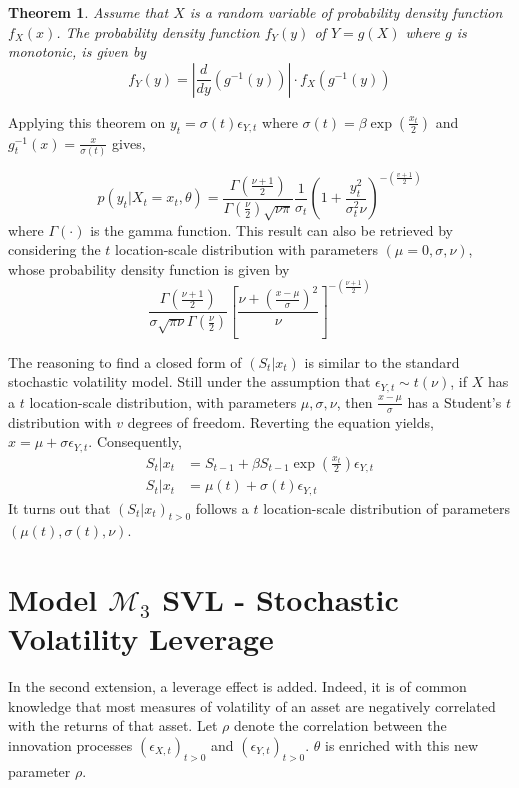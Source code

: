 \documentclass[11pt,a4,twosided,singlespacing,titlepagenumber=on]{scrreprt}
\numberwithin{equation}{chapter} %
\newtheorem{theorem}{Theorem}%
\theoremstyle{remark}
\begin{document}
\begin{theorem}
\textit{
Assume that $X$ is a random variable of probability density function $f_X(x)$. The probability density function $f_Y(y)$ of $Y=g(X)$ where $g$ is monotonic, is given by
}
$$f_Y(y) = \left|\frac{d}{dy}(g^{-1}(y))\right| \cdot f_X(g^{-1}(y))$$
\end{theorem}

\noindent
Applying this theorem on $y_t = \sigma(t) \epsilon_{Y,t}$ where $\sigma(t) = \beta \exp \left(\frac{x_t}{2} \right)$ and $g^{-1}_t(x) = \frac{x}{\sigma(t)}$ gives,

$$p(y_t | X_t = x_t, \theta) = \frac{\Gamma(\frac{\nu+1}{2})}{\Gamma(\frac{\nu}{2}) \sqrt{\nu\pi}} \frac{1}{\sigma_t}\left( 1 + \frac{y_t^2}{\sigma_t^2 \nu}\right)^{-\left(\frac{v+1}{2} \right)}$$
where $\Gamma(\cdot)$ is the gamma function. This result can also be retrieved by considering the $t$ location-scale distribution with parameters $(\mu = 0, \sigma, \nu)$, whose probability density function is given by
$$\frac{\Gamma \left(\frac{\nu+1}{2} \right)}{\sigma \sqrt{\pi \nu} \Gamma \left(\frac{\nu}{2} \right)} \left[ \frac{\nu + \left( \frac{x-\mu}{\sigma}\right)^2}{\nu}\right]^{-\left(\frac{\nu+1}{2} \right)}$$

The reasoning to find a closed form of $(S_t | x_t)$ is similar to the standard stochastic volatility model. Still under the assumption that $\epsilon_{Y,t} \sim t(\nu)$, if $X$ has a $t$ location-scale distribution, with parameters $\mu, \sigma, \nu$, then $\frac{x-\mu}{\sigma}$ has a Student's $t$ distribution with $v$ degrees of freedom. Reverting the equation yields, $x = \mu + \sigma \epsilon_{Y,t}$. Consequently,
\begin{align*}
S_t | x_t &= S_{t-1} + \beta S_{t-1} \exp \left( \frac{x_t}{2} \right) \epsilon_{Y,t} \\
S_t | x_t &= \mu(t) + \sigma(t) \epsilon_{Y,t}
\end{align*}
It turns out that $(S_t | x_t)_{t>0}$ follows a $t$ location-scale distribution of parameters $(\mu(t), \sigma(t), \nu)$.

\section{Model $\mathcal{M}_3$ SVL - Stochastic Volatility Leverage}
In the second extension, a leverage effect is added. Indeed, it is of common knowledge that most measures of volatility of an asset are negatively correlated with the returns of that asset. Let $\rho$ denote the correlation between the innovation processes $(\epsilon_{X,t})_{t>0}$ and $(\epsilon_{Y,t})_{t>0}$. $\theta$ is enriched with this new parameter $\rho$.
\end{document}
